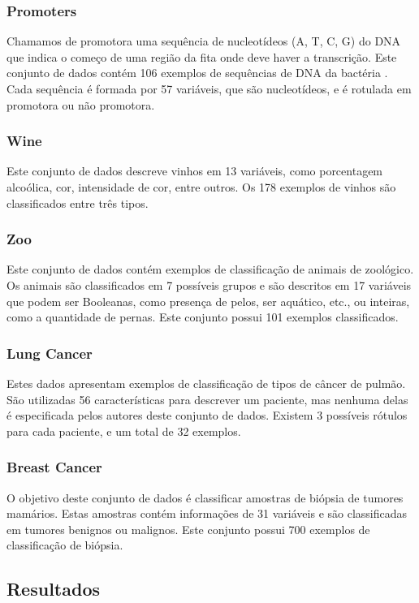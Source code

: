 \subsubsection{Promoters}
Chamamos de promotora uma sequência de nucleotídeos (A, T, C, G) do DNA 
que indica o começo de uma região da fita onde deve haver a transcrição. 
Este conjunto de dados contém 106 exemplos de sequências de DNA da 
bactéria . Cada sequência é formada por 57 variáveis,
que são nucleotídeos, e é rotulada em promotora ou não promotora.

\subsubsection{Wine}
Este conjunto de dados descreve vinhos em 13 variáveis, como porcentagem 
alcoólica, cor, intensidade de cor, entre outros. Os 178 exemplos de
vinhos são classificados entre três tipos.

\subsubsection{Zoo}
Este conjunto de dados contém exemplos de classificação de animais de
zoológico. Os animais são classificados em 7 possíveis grupos e são 
descritos em 17 variáveis que podem ser Booleanas, como presença de 
pelos, ser aquático, etc., ou inteiras, como a quantidade de pernas. 
Este conjunto possui 101 exemplos classificados.

\subsubsection{Lung Cancer}
Estes dados apresentam exemplos de classificação de tipos de câncer
de pulmão. São utilizadas 56 características para descrever um paciente,
mas nenhuma delas é especificada pelos autores deste conjunto de dados.
Existem 3 possíveis rótulos para cada paciente, e um total de 32 
exemplos.

\subsubsection{Breast Cancer}
O objetivo deste conjunto de dados é classificar amostras de biópsia
de tumores mamários. Estas amostras contém informações de 31 variáveis
e são classificadas em tumores benignos ou malignos. Este conjunto 
possui 700 exemplos de classificação de biópsia.


\subsection{Resultados}
